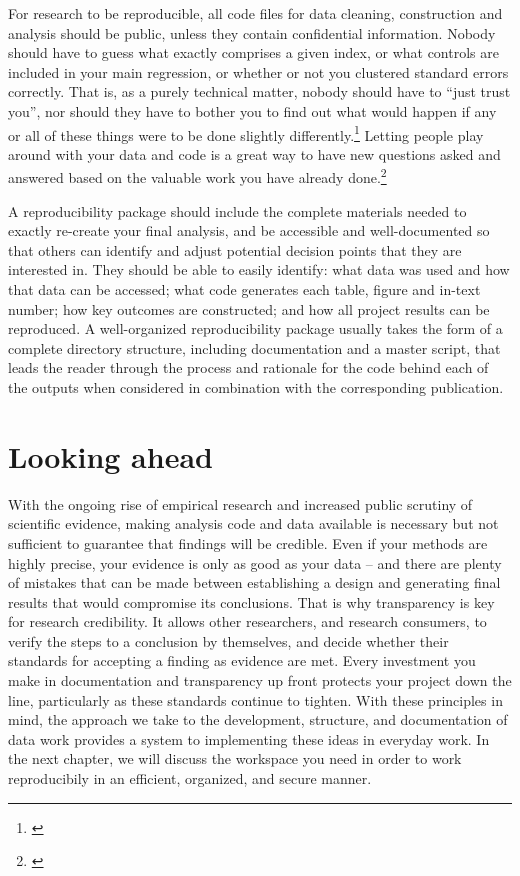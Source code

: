 \documentclass[]{tufte-book}
\begin{document}
For research to be reproducible, all code files for data cleaning,
construction and analysis should be public, unless they contain
confidential information. Nobody should have to guess what exactly
comprises a given index, or what controls are included in your main
regression, or whether or not you clustered standard errors correctly.
That is, as a purely technical matter, nobody should have to ``just
trust you'', nor should they have to bother you to find out what would
happen if any or all of these things were to be done slightly
differently.\footnote{\cite{@simonsohn2015specification}} Letting people
play around with your data and code is a great way to have new questions
asked and answered based on the valuable work you have already
done.\footnote{\href{https://blogs.worldbank.org/opendata/making-analytics-reusable}{}}

A reproducibility package should include the complete materials needed
to exactly re-create your final analysis, and be accessible and
well-documented so that others can identify and adjust potential
decision points that they are interested in. They should be able to
easily identify: what data was used and how that data can be accessed;
what code generates each table, figure and in-text number; how key
outcomes are constructed; and how all project results can be reproduced.
A well-organized reproducibility package usually takes the form of a
complete directory structure, including documentation and a master
script, that leads the reader through the process
and rationale for the code behind each of the outputs when considered in
combination with the corresponding publication.

\hypertarget{looking-ahead}{%
\section*{Looking ahead}\label{looking-ahead}}

With the ongoing rise of empirical research and increased public
scrutiny of scientific evidence, making analysis code and data available
is necessary but not sufficient to guarantee that findings will be
credible. Even if your methods are highly precise, your evidence is only
as good as your data -- and there are plenty of mistakes that can be
made between establishing a design and generating final results that
would compromise its conclusions. That is why transparency is key for
research credibility. It allows other researchers, and research
consumers, to verify the steps to a conclusion by themselves, and decide
whether their standards for accepting a finding as evidence are met.
Every investment you make in documentation and transparency up front
protects your project down the line, particularly as these standards
continue to tighten. With these principles in mind, the approach we take
to the development, structure, and documentation of data work provides a
system to implementing these ideas in everyday work. In the next
chapter, we will discuss the workspace you need in order to work
reproducibily in an efficient, organized, and secure manner.
\end{document}
